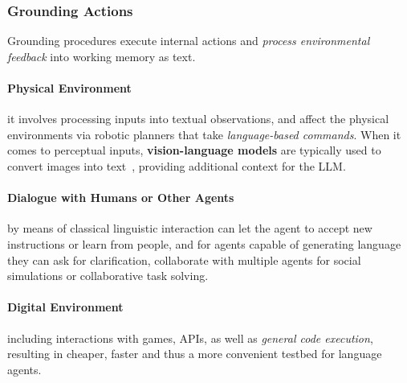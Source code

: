 \subsubsection{Grounding Actions}
Grounding procedures execute internal actions and \emph{process environmental
feedback} into working memory as text.

\paragraph{Physical Environment} it involves processing inputs into textual
observations, and affect the physical environments via robotic planners that
take \emph{language-based commands}. When it comes to perceptual inputs,
\textbf{vision-language models} are typically used to convert images into
text~\cite{alayrac2022flamingovisuallanguagemodel}, providing additional
context for the \ac{LLM}.

\paragraph{Dialogue with Humans or Other Agents} by means of classical
linguistic interaction can let the agent to accept new instructions or learn
from people, and for agents capable of generating language they can ask for
clarification, collaborate with multiple agents for social simulations or
collaborative task solving.

\paragraph{Digital Environment} including interactions with games, APIs, as well as
\emph{general code execution}, resulting in cheaper, faster and thus a more convenient
testbed for language agents.


